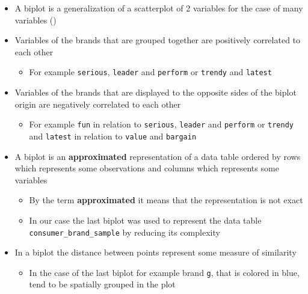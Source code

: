 \documentclass[
  ignorenonframetext,
]{beamer}
\providecommand{\tightlist}{%
  \setlength{\itemsep}{0pt}\setlength{\parskip}{0pt}}\usepackage{longtable,booktabs,array}
\begin{document}
\begin{frame}[fragile]{}
\label{section-44}
\begin{itemize}
\item
  A biplot is a generalization of a scatterplot of 2 variables for the
  case of many variables
  ()
\item
  Variables of the brands that are grouped together are positively
  correlated to each other

  \begin{itemize}
  \tightlist
  \item
    For example \texttt{serious}, \texttt{leader} and \texttt{perform}
    or \texttt{trendy} and \texttt{latest}
  \end{itemize}
\item
  Variables of the brands that are displayed to the opposite sides of
  the biplot origin are negatively correlated to each other

  \begin{itemize}
  \tightlist
  \item
    For example \texttt{fun} in relation to \texttt{serious},
    \texttt{leader} and \texttt{perform} or \texttt{trendy} and
    \texttt{latest} in relation to \texttt{value} and \texttt{bargain}
  \end{itemize}
\end{itemize}
\end{frame}

\begin{frame}[fragile]{}
\label{section-45}
\begin{itemize}
\item
  A biplot is an \textbf{approximated} representation of a data table
  ordered by rows which represents some observations and columns which
  represents some variables

  \begin{itemize}
  \item
    By the term \textbf{approximated} it means that the representation
    is not exact
  \item
    In our case the last biplot was used to represent the data table
    \texttt{consumer\_brand\_sample} by reducing its complexity
  \end{itemize}
\item
  In a biplot the distance between points represent some measure of
  similarity

  \begin{itemize}
  \tightlist
  \item
    In the case of the last biplot for example brand \texttt{g}, that is
    colored in blue, tend to be spatially grouped in the plot
  \end{itemize}
\end{itemize}
\end{frame}
\end{document}
